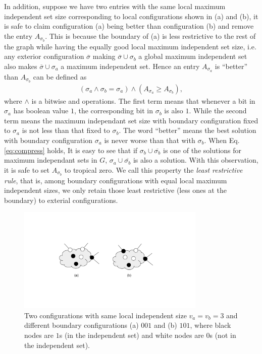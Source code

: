 \documentclass{article}
\newcommand{\<}{\langle}
\renewcommand{\>}{\rangle}
\theoremstyle{definition}\newtheorem{definition}{\textit{Definition}}
\begin{document}
In addition, suppose we have two entries with the same local maximum independent set size corresponding to local configurations shown in (a) and (b), it is safe to claim configuration (a) being better than configuration (b) and remove the entry $A_{\sigma_b}$.
This is because the boundary of (a) is less restrictive to the rest of the graph while having the equally good local maximum independent set size, 
i.e. any exterior configuration $\overline{\sigma}$ making $\overline{\sigma} \cup \sigma_b$ a global maximum independent set also makes $\overline{\sigma} \cup \sigma_a$ a maximum independent set.
Hence an entry $A_{\sigma_a}$ is ``better'' than $A_{\sigma_b}$ can be defined as
\begin{align}
(\sigma_a \land \sigma_b = \sigma_a) \land (A_{\sigma_a} \geq A_{\sigma_b}),\label{eq:compress}
\end{align}
where $\land$ is a bitwise and operations.
The first term means that whenever a bit in $\sigma_a$ has boolean value $1$, the corresponding bit in $\sigma_b$ is also $1$.
While the second term means the maximum independant set size with boundary configuration fixed to $\sigma_a$ is not less than that fixed to $\sigma_b$.
The word ``better'' means the best solution with boundary configuration $\sigma_a$ is never worse than that with $\sigma_b$.
When Eq. \ref{eq:compress} holds, It is easy to see that if $\sigma_b \cup \overline{\sigma_b}$ is one of the solutions for maximum independant sets in $G$, $\sigma_a \cup \overline{\sigma_b}$ is also a solution.
With this observation, it is safe to set $A_{\sigma_b}$ to tropical zero.
We call this property the \textit{least restrictive rule}, that is,
among boundary configurations with equal local maximum independent sizes,
we only retain those least restrictive (less ones at the boundary) to exterial configurations.

\begin{figure}
    \centering
    \includegraphics[width=0.8\textwidth, trim={5cm 4cm 5cm 4cm}, clip]{compressionrule.pdf}
    \caption{Two configurations with same local independent size $v_a = v_b = 3$ and different boundary configurations (a) ${001}$ and (b) ${101}$, where black nodes are $1$s (in the independent set) and white nodes are $0$s (not in the independent set).}\label{fig:compressrule}
\end{figure}
\end{document}
